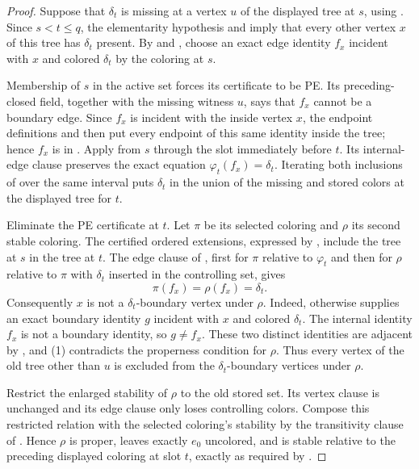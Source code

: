 \begin{proof}
Suppose that \(\delta_t\) is missing at a vertex \(u\) of the displayed tree
at \(s\), using .  Since \(s<t\le q\), the
elementarity hypothesis and  imply that
every other vertex \(x\) of this tree has \(\delta_t\) present.  By
 and , choose an exact edge
identity \(f_x\) incident with \(x\) and colored \(\delta_t\) by the
coloring at \(s\).

Membership of \(s\) in the active set forces its certificate to be PE.  Its
preceding-closed field, together with the missing witness \(u\), says that
\(f_x\) cannot be a boundary edge.  Since \(f_x\) is incident with the
inside vertex \(x\), the endpoint definitions  and
 then put every endpoint of this same identity inside
the tree; hence \(f_x\) is in .  Apply
 from \(s\) through the slot immediately
before \(t\).  Its internal-edge clause preserves the exact equation
\(\varphi_t(f_x)=\delta_t\).  Iterating both inclusions of
 over the same interval puts
\(\delta_t\) in the union of the missing and stored colors at the displayed
tree for \(t\).

Eliminate the PE certificate at \(t\).  Let \(\pi\) be its selected coloring
and \(\rho\) its second stable coloring.  The certified ordered extensions,
expressed by , include the tree at
\(s\) in the tree at \(t\).  The edge clause of
, first for \(\pi\) relative to \(\varphi_t\) and
then for \(\rho\) relative to \(\pi\) with \(\delta_t\) inserted in the
controlling set, gives
\[
             \pi(f_x)=\rho(f_x)=\delta_t.                 \tag{1}
\]
Consequently \(x\) is not a \(\delta_t\)-boundary vertex under \(\rho\).
Indeed, otherwise  supplies an exact boundary
identity \(g\) incident with \(x\) and colored \(\delta_t\).  The internal
identity \(f_x\) is not a boundary identity, so \(g\ne f_x\).  These two
distinct identities are adjacent by , and (1)
contradicts the properness condition  for
\(\rho\).  Thus every vertex of the old tree other than \(u\) is excluded
from the \(\delta_t\)-boundary vertices under \(\rho\).                 \(\tag{2}\)

Restrict the enlarged stability of \(\rho\) to the old stored set.  Its
vertex clause is unchanged and its edge clause only loses controlling
colors.  Compose this restricted relation with the selected coloring's
stability by the transitivity clause of .  Hence \(\rho\) is
proper, leaves exactly \(e_0\) uncolored, and is stable relative to the
preceding displayed coloring at slot \(t\), exactly as required by
.


\end{proof}
